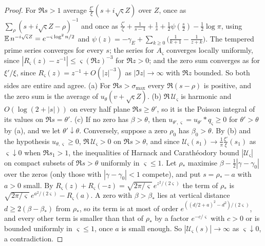 \begin{proof}
For $\Re s>1$ average $\frac{\xi'}{\xi}(s+i\sqrt\varsigma Z)$ over $Z$, once as $\sum_\rho(s+i\sqrt\varsigma Z-\rho)^{-1}$ and once as $\frac{\zeta'}{\zeta}+\frac1{s-1}+\frac1s+\frac12\psi(\frac s2)-\frac12\log\pi$, using $\mathbb{E}\,n^{-i\sqrt\varsigma Z}=e^{-\varsigma\log^2n/2}$ and $\psi(z)=-\gamma_E+\sum_{k\ge0}\bigl(\frac1{k+1}-\frac1{z+k}\bigr)$. The tempered prime series converges for every $s$; the series for $A_\varsigma$ converges locally uniformly, since $|R_\varsigma(z)-z^{-1}|\le\varsigma(\Re z)^{-3}$ for $\Re z>0$; and the zero sum converges as for $\xi'/\xi$, since $R_\varsigma(z)=z^{-1}+O(|z|^{-3})$ as $|\Im z|\to\infty$ with $\Re z$ bounded. So both sides are entire and agree. (a) For $\Re s>\sigma_{\max}$ every $\Re(s-\rho)$ is positive, and the zero sum is the average of $u_\theta(v+\sqrt\varsigma Z)$. (b) $\Re\,\mathcal U_\varsigma$ is harmonic and $O(\log(2+|s|))$ on every half plane $\Re s\ge\theta'$, so it is the Poisson integral of its values on $\Re s=\theta'$. (c) If no zero has $\beta>\theta$, then $u_{\theta',\varsigma}=u_{\theta'}*q_\varsigma\ge0$ for $\theta'>\theta$ by (a), and we let $\theta'\downarrow\theta$. Conversely, suppose a zero $\rho_0$ has $\beta_0>\theta$. By (b) and the hypothesis $u_{\theta,\varsigma}\ge0$, $\Re\,\mathcal U_\varsigma>0$ on $\Re s>\theta$, and since $\mathcal U_\varsigma(s_1)\to\frac1\pi\frac{\xi'}{\xi}(s_1)$ as $\varsigma\downarrow0$ when $\Re s_1>1$, the inequalities of Harnack and Carath\'eodory bound $|\mathcal U_\varsigma|$ on compact subsets of $\Re s>\theta$ uniformly in $\varsigma\le1$. Let $\rho_*$ maximise $\beta-\frac12|\gamma-\gamma_0|$ over the zeros (only those with $|\gamma-\gamma_0|<1$ compete), and put $s=\rho_*-a$ with $a>0$ small. By $R_\varsigma(z)+R_\varsigma(-z)=\sqrt{2\pi/\varsigma}\,e^{z^2/(2\varsigma)}$ the term of $\rho_*$ is $\sqrt{2\pi/\varsigma}\,e^{a^2/(2\varsigma)}-R_\varsigma(a)$. A zero with $\beta>\beta_*$ lies at vertical distance $d\ge2(\beta-\beta_*)$ from $\rho_*$, so its term is at most of order $e^{((d/2+a)^2-d^2)/(2\varsigma)}$, and every other term is smaller than that of $\rho_*$ by a factor $e^{-c/\varsigma}$ with $c>0$ or is bounded uniformly in $\varsigma\le1$, once $a$ is small enough. So $|\mathcal U_\varsigma(s)|\to\infty$ as $\varsigma\downarrow0$, a contradiction.
\end{proof}

